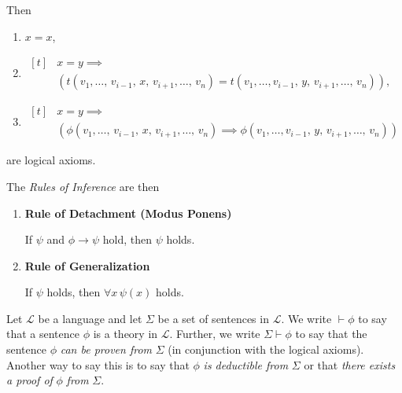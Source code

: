 \documentclass[../../main.tex]{subfiles}
\begin{document}
\begin{definition}
\begin{enumerate}
        Then 
        \begin{enumerate}
            \item $x = x$,
            \item $\begin{aligned}[t]
                & x = y \implies \\
                & \left(t(v_1,\ldots,\, v_{i-1},\, x,\, v_{i+1},\ldots,\, v_n) = t(v_1,\ldots,v_{i-1},\, y,\, v_{i+1},\ldots,\, v_n)\right),
            \end{aligned}$
            \item $\begin{aligned}[t]
                & x = y \implies \\
                & \left(\phi(v_1,\ldots,\, v_{i-1},\, x,\, v_{i+1},\ldots,\, v_n) \implies \phi(v_1,\ldots,v_{i-1},\, y,\, v_{i+1},\ldots,\, v_n)\right)
            \end{aligned}$
        \end{enumerate}
        are logical axioms.
    \end{enumerate}
    The \textit{Rules of Inference} are then
    \begin{enumerate}[resume]
        \item \textbf{Rule of Detachment (Modus Ponens)}
        
        If $\psi$ and $\phi \rightarrow \psi$ hold, then $\psi$ holds.
        \item \textbf{Rule of Generalization}
        
        If $\psi$ holds, then $\forall x\, \psi(x)$ holds.
    \end{enumerate}
\end{definition}

\begin{definition}[Proof]\label{proof-def}\cite[p.25]{Cha90}
    Let $\mathcal{L}$ be a language and let $\Sigma$ be a set of sentences in $\mathcal{L}$.
    We write $\vdash \phi$ to say that a sentence $\phi$ is a theory in $\mathcal{L}$.
    Further, we write $\Sigma \vdash \phi$ to say that the sentence $\phi$ \textit{can be proven from} $\Sigma$ (in conjunction with the logical axioms).
    Another way to say this is to say that $\phi$ \textit{is deductible from} $\Sigma$ or that \textit{there exists a proof of} $\phi$ \textit{from} $\Sigma$.
\end{definition}
\end{document}
